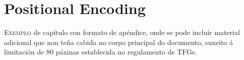 \chapter{Positional Encoding}
\label{chap:Positional Encoding}

\lettrine{E}{xemplo} de capítulo con formato de apéndice, onde se pode
incluír material adicional que non teña cabida no corpo principal do
documento, suxeito á limitación de 80 páxinas establecida no
regulamento de TFGs.

\Blindtext

